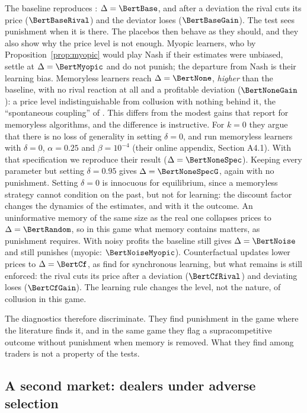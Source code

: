 The baseline reproduces \citet{calvano2020}: $\Delta=\BertBase$, and after a
deviation the rival cuts its price ($\BertBaseRival$) and the deviator loses
($\BertBaseGain$). The test sees punishment when it is there. The placebos
then behave as they should, and they also show why the price level is not
enough. Myopic learners, who by Proposition~\ref{prop:myopic} would play Nash
if their estimates were unbiased, settle at $\Delta=\BertMyopic$ and do not
punish; the departure from Nash is their learning bias. Memoryless learners
reach $\Delta=\BertNone$, \emph{higher} than the baseline, with no rival
reaction at all and a profitable deviation ($\BertNoneGain$): a price level
indistinguishable from collusion with nothing behind it, the ``spontaneous
coupling'' of \citet{banchio2023}. This differs from the modest gains that
\citet{calvano2020} report for memoryless algorithms, and the difference is
instructive. For $k=0$ they argue that there is no loss of generality in
setting $\delta=0$, and run memoryless learners with $\delta=0$, $\alpha=0.25$
and $\beta=10^{-4}$ (their online appendix, Section A4.1). With that
specification we reproduce their result ($\Delta=\BertNoneSpec$). Keeping
every parameter but setting $\delta=0.95$ gives $\Delta=\BertNoneSpecG$, again
with no punishment. Setting $\delta=0$ is innocuous for equilibrium, since a
memoryless strategy cannot condition on the past, but not for learning:
the discount factor changes the dynamics of the estimates, and with it the
outcome. An uninformative memory of the same size as
the real one collapses prices to $\Delta=\BertRandom$, so in this game what
memory contains matters, as punishment requires. With noisy profits the
baseline still gives $\Delta=\BertNoise$ and still punishes (myopic:
$\BertNoiseMyopic$). Counterfactual updates lower prices to
$\Delta=\BertCf$, as \citet{asker2022} find for synchronous learning, but what
remains is still enforced: the rival cuts its price after a deviation
($\BertCfRival$) and deviating loses ($\BertCfGain$). The learning rule
changes the level, not the nature, of collusion in this game.

The diagnostics therefore discriminate. They find punishment in the game
where the literature finds it, and in the same game they flag a
supracompetitive outcome without punishment when memory is removed. What
they find among traders is not a property of the tests.

\subsection{A second market: dealers under adverse selection}
\label{sec:dealers}

